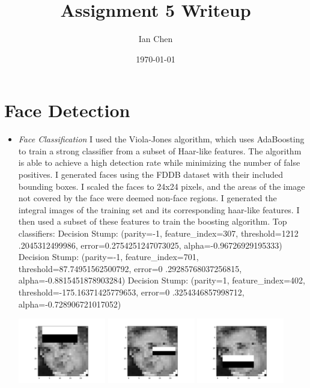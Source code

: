 \documentclass[11pt]{article}
\title{Assignment 5 Writeup}
\author{Ian Chen}
\date{\today}
\begin{document}
    \maketitle


    \section{Face Detection}

    \begin{itemize}
        \item \textit{Face Classification}\newline
        I used the Viola-Jones algorithm, which uses AdaBoosting to train a strong classifier from a
        subset of Haar-like features. The algorithm is able to achieve a high detection rate while
        minimizing the number of false positives. I generated faces using the FDDB dataset with
        their included bounding boxes.\newline
        I scaled the faces to 24x24 pixels, and the areas of the image not covered by the face were
        deemed non-face regions. I generated the integral images of the training set and its
        corresponding haar-like features. I then used a subset of these features to train the
        boosting algorithm.\newline
        Top classifiers: Decision Stump: (parity=-1, feature\_index=307, threshold=1212
        .2045312499986, error=0.2754251247073025, alpha=-0.96726929195333)\newline
        Decision Stump: (parity=-1, feature\_index=701, threshold=87.74951562500792, error=0
        .29285768037256815, alpha=-0.8815451878903284)\newline
        Decision Stump: (parity=1, feature\_index=402, threshold=-175.16371425779653, error=0
        .3254346857998712, alpha=-0.728906721017052)\newline
        \begin{center}
            \includegraphics[width=0.3\textwidth]{Output Pictures/rec_1}
            \includegraphics[width=0.3\textwidth]{Output Pictures/rec_2}
            \includegraphics[width=0.3\textwidth]{Output Pictures/rec_3}
        \end{center}


\end{itemize}
\end{document}
